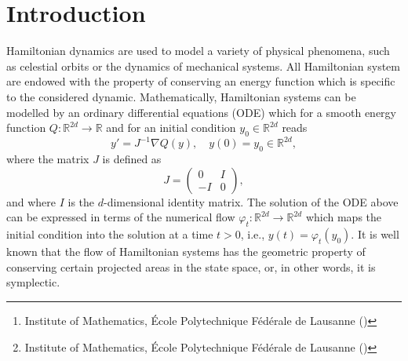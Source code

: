 \documentclass{siamart1116}
\title{{\TheTitle}}
\author{Assyr Abdulle\thanks{Institute of Mathematics, \'Ecole Polytechnique F\'ed\'erale de Lausanne (\email{assyr.abdulle@epfl.ch})}
		\and
		Giacomo Garegnani\thanks{Institute of Mathematics, \'Ecole Polytechnique F\'ed\'erale de Lausanne (\email{giacomo.garegnani@epfl.ch})}}
\numberwithin{theorem}{section}
\renewcommand{\phi}{\varphi}
\newcommand{\R}{\mathbb{R}}
\begin{document}
\maketitle

\begin{abstract} The long-time energy conservation of the random time stepping Runge-Kutta method (RTS-RK) introduced in [A. Abdulle and G. Garegnani, \textit{Random time step probabilistic methods for uncertainty quantification in chaotic and geometric numerical integration}, arXiv:1801.01340, 2018] is studied. Departing from classical backward error analysis tools, we show that the accumulation of errors due to random perturbations causes an energy drift which grows as the square root of time. Nonetheless, we are able to prove that the approximation in the mean sense of the Hamiltonian given by our probabilistic integrator has the same quality as an equivalent deterministic symplectic method over time spans of polynomial length. Numerical examples confirm our theoretical findings and show the effectiveness of the probabilistic approach in the frame of Bayesian inverse problems.
\end{abstract}

\section{Introduction}

Hamiltonian dynamics are used to model a variety of physical phenomena, such as celestial orbits or the dynamics of mechanical systems. All Hamiltonian system are endowed with the property of conserving an energy function which is specific to the considered dynamic. Mathematically, Hamiltonian systems can be modelled by an ordinary differential equations (ODE) which for a smooth energy function $Q\colon \R^{2d} \to \R$ and for an initial condition $y_0 \in \R^{2d}$ reads
\begin{equation}
y' = J^{-1}\nabla Q(y), \quad y(0) = y_0 \in \R^{2d},
\end{equation}
where the matrix $J$ is defined as
\begin{equation}
J = \begin{pmatrix} 0 & I \\ -I & 0 \end{pmatrix},
\end{equation}
and where $I$ is the $d$-dimensional identity matrix. The solution of the ODE above can be expressed in terms of the numerical flow $\phi_t \colon \R^{2d} \to \R^{2d}$ which maps the initial condition into the solution at a time $t > 0$, i.e., $y(t) = \phi_t(y_0)$. It is well known that the flow of Hamiltonian systems has the geometric property of conserving certain projected areas in the state space, or, in other words, it is symplectic. 
\end{document}
